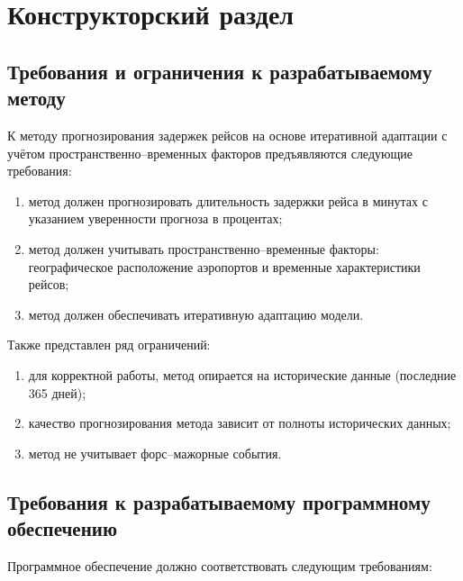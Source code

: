 \chapter{Конструкторский раздел}


\section{Требования и ограничения к разрабатываемому методу}

К методу прогнозирования задержек рейсов на основе итеративной адаптации с учётом пространственно--временных факторов предъявляются следующие требования:

\begin{enumerate}[label=\arabic*)]
    \item метод должен прогнозировать длительность задержки рейса в минутах с указанием уверенности прогноза в процентах;
    \item метод должен учитывать пространственно--временные факторы: географическое расположение аэропортов и временные характеристики рейсов;
    \item метод должен обеспечивать итеративную адаптацию модели.
\end{enumerate}

Также представлен ряд ограничений:
\begin{enumerate}[label=\arabic*)]
    \item для корректной работы, метод опирается на исторические данные (последние 365 дней);
    \item качество прогнозирования метода зависит от полноты исторических данных;
    \item метод не учитывает форс--мажорные события.
\end{enumerate}


\section{Требования к разрабатываемому программному обеспечению}

Программное обеспечение должно соответствовать следующим требованиям:

